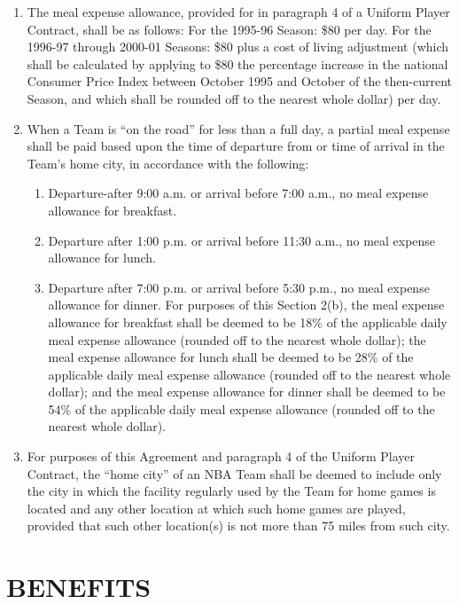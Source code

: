 \documentclass[
]{book}
\providecommand{\tightlist}{%
  \setlength{\itemsep}{0pt}\setlength{\parskip}{0pt}}
\begin{document}
\begin{enumerate}
\def\labelenumi{(\alph{enumi})}
\tightlist
\item
  The meal expense allowance, provided for in paragraph 4 of a Uniform Player Contract, shall be as follows:
  For the 1995-96 Season: \$80 per day.
  For the 1996-97 through 2000-01 Seasons: \$80 plus a cost of living adjustment (which shall be calculated by applying to \$80 the percentage increase in the national Consumer Price Index between October 1995 and October of the then-current Season, and which shall be rounded off to the nearest whole dollar) per day.
\item
  When a Team is ``on the road'' for less than a full day, a partial meal expense shall be paid based upon the time of departure from or time of arrival in the Team's home city, in accordance with the following:

  \begin{enumerate}
  \def\labelenumii{(\roman{enumii})}
  \tightlist
  \item
    Departure-after 9:00 a.m. or arrival before 7:00 a.m., no meal expense allowance for breakfast.
  \item
    Departure after 1:00 p.m. or arrival before 11:30 a.m., no meal expense allowance for lunch.
  \item
    Departure after 7:00 p.m. or arrival before 5:30 p.m., no meal expense allowance for dinner.
    For purposes of this Section 2(b), the meal expense allowance for breakfast shall be deemed to be 18\% of the applicable daily meal expense allowance (rounded off to the nearest whole dollar); the meal expense allowance for lunch shall be deemed to be 28\% of the applicable daily meal expense allowance (rounded off to the nearest whole dollar); and the meal expense allowance for dinner shall be deemed to be 54\% of the applicable daily meal expense allowance (rounded off to the nearest whole dollar).
  \end{enumerate}
\item
  For purposes of this Agreement and paragraph 4 of the Uniform Player Contract, the ``home city'' of an NBA Team shall be deemed to include only the city in which the facility regularly used by the Team for home games is located and any other location at which such home games are played, provided that such other location(s) is not more than 75 miles from such city.
\end{enumerate}

\hypertarget{benefits}{%
\chapter{BENEFITS}\label{benefits}}
\end{document}
